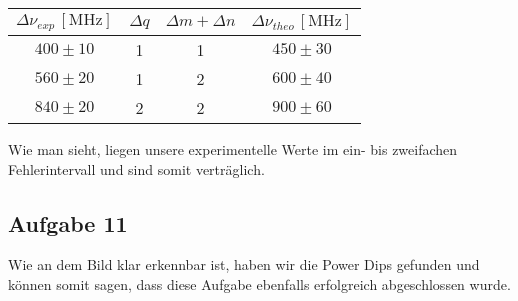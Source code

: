 \begin{center}
\begin{tabular}{c|c|c|c}
$\Delta\nu_{exp}\,[\text{MHz}]$ & $\Delta q$ & $\Delta m + \Delta n$ & $\Delta\nu_{theo}\,[\text{MHz}]$ \\\hline
$400 \pm 10$ & 1 & 1 & $450 \pm 30$ \\
$560 \pm 20$ & 1 & 2 & $600 \pm 40$ \\
$840 \pm 20$ & 2 & 2 & $900 \pm 60$
\end{tabular}
\end{center}

Wie man sieht, liegen unsere experimentelle Werte im ein- bis zweifachen Fehlerintervall und sind somit verträglich. 

\subsection*{Aufgabe 11}
Wie an dem Bild klar erkennbar ist, haben wir die Power Dips gefunden und können somit sagen, dass diese Aufgabe ebenfalls erfolgreich abgeschlossen wurde.
